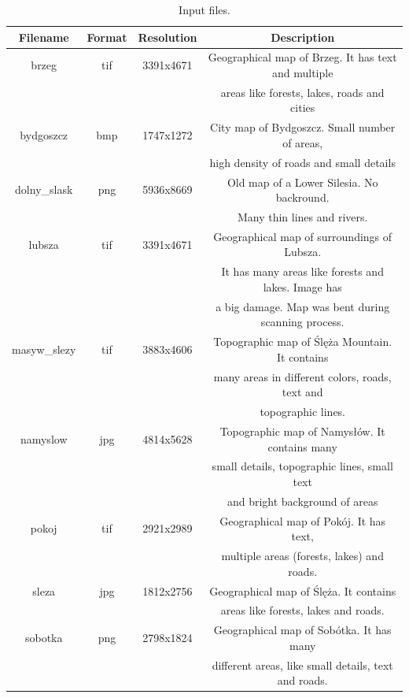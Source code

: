 \documentclass[a4paper,onecolumn,oneside,12pt]{memoir}
\begin{document}
\begin{table}[!ht]
\begin{center}
\caption{Input files.}
\label{tableInputFiles}
\begin{tabular}{|c|c|c|c|}
  \hline
  Filename & Format & Resolution & Description \\
  \hline
  brzeg & tif & 3391x4671 & Geographical map of Brzeg. It has text and multiple \\
        &     &           & areas like forests, lakes, roads and cities \\
  \hline
  bydgoszcz & bmp & 1747x1272 & City map of Bydgoszcz. Small number of areas, \\
            &     &           & high density of roads and small details \\
  \hline
  dolny\_slask & png & 5936x8669 & Old map of a Lower Silesia. No backround. \\
              &     &           & Many thin lines and rivers. \\
  \hline
  lubsza & tif & 3391x4671 & Geographical map of surroundings of Lubsza. \\
         &     &           & It has many areas like forests and lakes. Image has \\
         &     &           & a big damage. Map was bent during scanning process. \\
  \hline
  masyw\_slezy & tif & 3883x4606 & Topographic map of Ślęża Mountain. It contains \\
              &     &           & many areas in different colors, roads, text and \\
              &     &           & topographic lines. \\
  \hline
  namyslow & jpg & 4814x5628 & Topographic map of Namysłów. It contains many \\
           &     &           & small details, topographic lines, small text  \\
           &     &           & and bright background of areas\\
  \hline
  pokoj & tif & 2921x2989 & Geographical map of Pokój. It has text, \\
        &     &           & multiple areas (forests, lakes) and roads. \\
  \hline
  sleza & jpg & 1812x2756 & Geographical map of Ślęża. It contains \\
        &     &           & areas like forests, lakes and roads. \\
  \hline
  sobotka & png & 2798x1824 & Geographical map of Sobótka. It has many \\
          &     &           & different areas, like small details, text and roads. \\
  \hline
\end{tabular}
\end{center}
\end{table}
\end{document}
